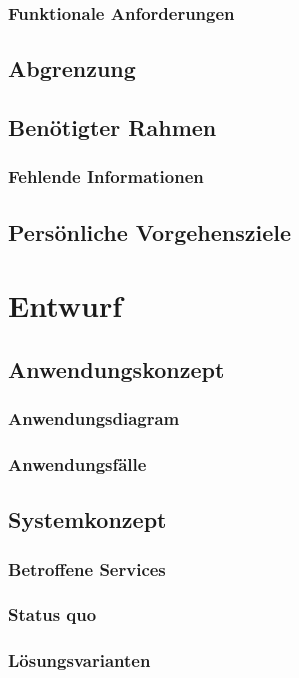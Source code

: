 \subsection{Funktionale Anforderungen}

\section{Abgrenzung}

\section{Benötigter Rahmen}
\subsection{Fehlende Informationen}

\section{Persönliche Vorgehensziele}

\chapter{Entwurf}
\section{Anwendungskonzept}
\subsection{Anwendungsdiagram}
\subsection{Anwendungsfälle}

\section{Systemkonzept}
\subsection{Betroffene Services}
\subsection{Status quo}
\subsection{Lösungsvarianten}
